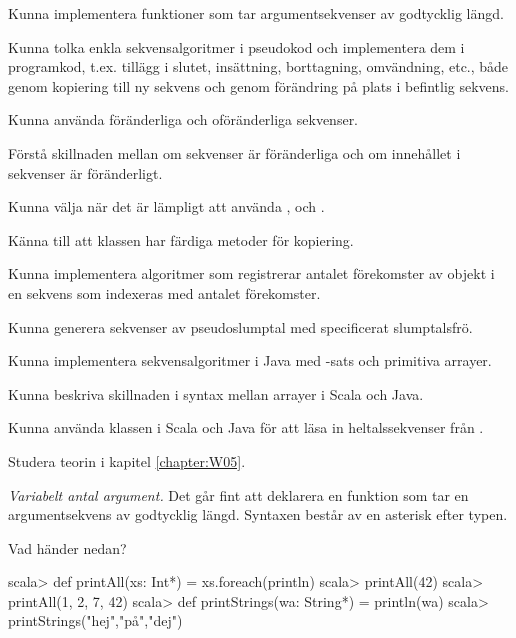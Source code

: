 

\Exercise{\ExeWeekFIVE}

\begin{Goals}
\item Kunna implementera funktioner som tar argumentsekvenser av godtycklig längd.
\item Kunna tolka enkla sekvensalgoritmer i pseudokod och implementera dem i programkod, t.ex. tillägg i slutet, insättning, borttagning, omvändning, etc., både genom kopiering till ny sekvens och genom förändring på plats i befintlig sekvens.  
\item Kunna använda föränderliga och oföränderliga sekvenser.
\item Förstå skillnaden mellan om sekvenser är föränderliga och om innehållet i sekvenser är föränderligt.
\item Kunna välja när det är lämpligt att använda ,  och .
\item Känna till att klassen  har färdiga metoder för kopiering.
\item Kunna implementera algoritmer som registrerar antalet förekomster av objekt i en sekvens som indexeras med antalet förekomster.
\item Kunna generera sekvenser av pseudoslumptal med specificerat slumptalsfrö. 
\item Kunna implementera sekvensalgoritmer i Java med -sats och primitiva arrayer. 
\item Kunna beskriva skillnaden i syntax mellan arrayer i Scala och Java.
\item Kunna använda klassen  i Scala och Java för att läsa in heltalssekvenser från . 
\end{Goals}

\begin{Preparations}
\item Studera teorin i kapitel \ref{chapter:W05}.
\end{Preparations}

\BasicTasks %

\Task \emph{Variabelt antal argument.} Det går fint att deklarera en funktion som tar en argumentsekvens av godtycklig längd. Syntaxen består av en asterisk \code{*} efter typen.

\Subtask Vad händer nedan?
\begin{REPL}
scala> def printAll(xs: Int*) = xs.foreach(println)
scala> printAll(42)
scala> printAll(1, 2, 7, 42)
scala> def printStrings(wa: String*) = println(wa)
scala> printStrings("hej","på","dej")
\end{REPL}

